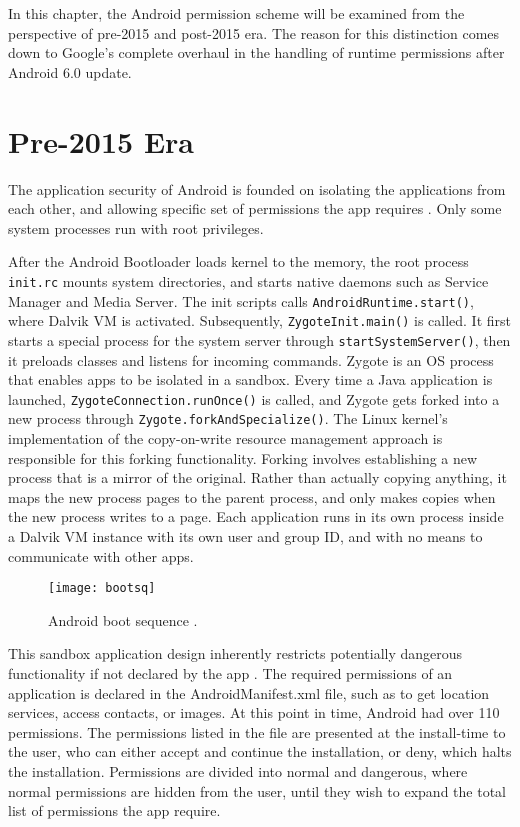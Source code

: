 \documentclass[
  a4paper,  %
  twoside,  %
  bibliography=totoc,
  headsepline,
  cleardoublepage=empty,
  parskip=half,
  draft=false,
  open=any
]{scrbook}
\begin{document}
In this chapter, the Android permission scheme will be examined from the perspective of pre-2015 and post-2015 era. The reason for this distinction comes down to Google's complete overhaul in the handling of runtime permissions after Android 6.0 update.

\section{Pre-2015 Era}
The application security of Android is founded on isolating the applications from each other, and allowing specific set of permissions the app requires \cite{liebergeld2013}. Only some system processes run with root privileges. 

After the Android Bootloader loads kernel to the memory, the root process \texttt{init.rc} mounts system directories, and starts native daemons such as Service Manager and Media Server. The init scripts calls \texttt{AndroidRuntime.start()}, where Dalvik VM is activated. Subsequently, \texttt{ZygoteInit.main()} is called. It first starts a special process for the system server through \texttt{startSystemServer()}, then it preloads classes and listens for incoming commands. Zygote is an OS process that enables apps to be isolated in a sandbox. Every time a Java application is launched, \texttt{ZygoteConnection.runOnce()} is called, and Zygote gets forked into a new process through \texttt{Zygote.forkAndSpecialize()}. The Linux kernel's implementation of the copy-on-write resource management approach is responsible for this forking functionality. Forking involves establishing a new process that is a mirror of the original. Rather than actually copying anything, it maps the new process pages to the parent process, and only makes copies when the new process writes to a page. Each application runs in its own process inside a Dalvik VM instance with its own user and group ID, and with no means to communicate with other apps.
\begin{figure}\centering
	\texttt{[image: bootsq]}
	\caption{Android boot sequence \cite{vidal2018}.}
	\label{bootsequence}
\end{figure}

This sandbox application design inherently restricts potentially dangerous  functionality if not declared by the app \cite{barrera2010}. The required permissions of an application is declared in the AndroidManifest.xml file, such as to get location services, access contacts, or images. At this point in time, Android had over 110 permissions. The permissions listed in the file are presented at the install-time to the user, who can either accept and continue the installation, or deny, which halts the installation. Permissions are divided into normal and dangerous, where normal permissions are hidden from the user, until they wish to expand the total list of permissions the app require. %
 
\end{document}
